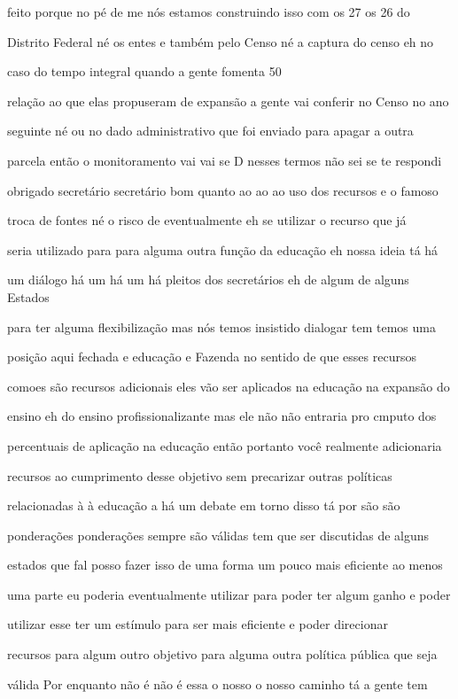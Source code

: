 \documentclass[a4paper,12pt]{article}
\begin{document}
feito porque no pé de me nós estamos construindo isso com os 27 os 26 do

Distrito Federal né os entes e também pelo Censo né a captura do censo eh no

caso do tempo integral quando a gente fomenta 50%

relação ao que elas propuseram de expansão a gente vai conferir no Censo no ano

seguinte né ou no dado administrativo que foi enviado para apagar a outra

parcela então o monitoramento vai vai se D nesses termos não sei se te respondi

obrigado secretário secretário bom quanto ao ao ao uso dos recursos e o famoso

troca de fontes né o risco de eventualmente eh se utilizar o recurso que já

seria utilizado para para alguma outra função da educação eh nossa ideia tá há

um diálogo há um há um há pleitos dos secretários eh de algum de alguns Estados

para ter alguma flexibilização mas nós temos insistido dialogar tem temos uma

posição aqui fechada e educação e Fazenda no sentido de que esses recursos

comoes são recursos adicionais eles vão ser aplicados na educação na expansão do

ensino eh do ensino profissionalizante mas ele não não entraria pro cmputo dos

percentuais de aplicação na educação então portanto você realmente adicionaria

recursos ao cumprimento desse objetivo sem precarizar outras políticas

relacionadas à à educação a há um debate em torno disso tá por são são

ponderações ponderações sempre são válidas tem que ser discutidas de alguns

estados que fal posso fazer isso de uma forma um pouco mais eficiente ao menos

uma parte eu poderia eventualmente utilizar para poder ter algum ganho e poder

utilizar esse ter um estímulo para ser mais eficiente e poder direcionar

recursos para algum outro objetivo para alguma outra política pública que seja

válida Por enquanto não é não é essa o nosso o nosso caminho tá a gente tem
\end{document}
